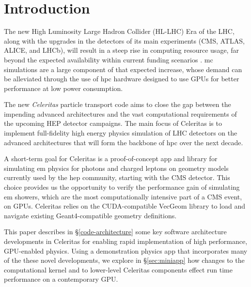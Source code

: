 \documentclass{webofc}
\begin{document}
\section{Introduction}
\label{sec:introduction}

The new High Luminosity Large Hadron Collider (HL-LHC) Era of the LHC, along
with the upgrades in the detectors of its main experiments (CMS, ATLAS, ALICE,
and LHCb), will result in a steep rise in computing resource usage, far beyond
the expected availability within current funding scenarios
\cite{the_hep_software_foundation_roadmap_2019}. \ac{mc} simulations are a
large component of that expected increase, whose demand can be alleviated
through the use of \ac{hpc} hardware designed to use GPUs for better
performance at low power consumption.

The new \emph{Celeritas} particle transport code aims to close the gap between
the impending advanced architectures and the vast computational
requirements of the upcoming HEP detector campaigns. The main focus of
Celeritas is to implement full-fidelity high energy physics simulation of
LHC detectors on the advanced architectures that will form the backbone of
\ac{hpc} over the next decade.

A short-term goal for Celeritas is a proof-of-concept app and library for
simulating \ac{em} physics for photons and charged leptons on
geometry models currently used by the \ac{hep} community, starting with the CMS
detector.
This choice provides us the opportunity to verify the
performance gain of simulating \ac{em} showers, which are the most
computationally intensive part of a CMS event, on GPUs. Celeritas relies on the
CUDA-compatible VecGeom \cite{VecGeom:web} library to load and navigate existing
Geant4-compatible geometry definitions.

This paper describes in \S\ref{code-architecture} some key software architecture
developments in Celeritas for enabling rapid implementation of high
performance, GPU-enabled physics. Using a demonstration physics app that
incorporates many of the these novel developments, we explore in
\S\ref{sec:miniapp} how changes to the computational kernel and to lower-level
Celeritas components effect run time performance on a contemporary GPU.



\end{document}

